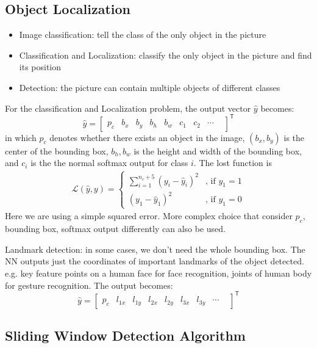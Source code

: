 \subsection{Object Localization}
\begin{itemize}
  \item Image classification: tell the class of the only object in the picture
  \item Classification and Localization: classify the only object in the picture and find its position
  \item Detection: the picture can contain multiple objects of different classes
\end{itemize}
For the classification and Localization problem, the output vector $\hat{y}$ becomes:
\[\hat{y}=\begin{bmatrix}
p_c & b_x & b_y & b_h & b_w & c_1 & c_2 & \cdots & 
\end{bmatrix}^{\mathsf{T}}\]
in which $p_c$ denotes whether there exists an object in the image, $(b_x, b_y)$ is the center of the bounding box, $b_h, b_w$ is the height and width of the bounding box, and $c_i$ is the the normal softmax output for class $i$. The lost function is 
\begin{align*}
  \mathcal{L}\left(\hat{y},y\right)=\left\{
  \begin{aligned}
    \displaystyle\sum_{i=1}^{n_c+5}\left(y_i-\hat{y}_i\right)^2&\text{, if }y_1=1\\
    \left(y_1-\hat{y}_1\right)^2&\text{, if }y_1=0
  \end{aligned}
  \right.
\end{align*}
Here we are using a simple squared error. More complex choice that consider $p_c$, bounding box, softmax output differently can also be used.

Landmark detection: in some cases, we don't need the whole bounding box. The NN outputs just the coordinates of important landmarks of the object detected. e.g. key feature points on a human face for face recognition, joints of human body for gesture recognition. The output becomes:
\[\hat{y}=\begin{bmatrix}
  p_c & l_{1x} & l_{1y} & l_{2x} & l_{2y} & l_{3x} & l_{3y} & \cdots & 
\end{bmatrix}^{\mathsf{T}}\]
\subsection{Sliding Window Detection Algorithm}
